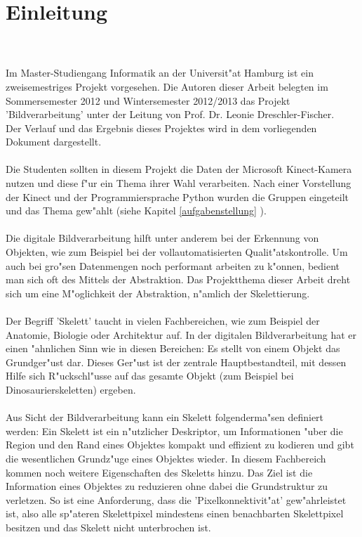 \chapter{Einleitung}
\label{ch:einleitung}
\\ \\
Im Master-Studiengang Informatik an der Universit"at Hamburg ist ein zweisemestriges Projekt vorgesehen. Die Autoren dieser Arbeit belegten im Sommersemester 2012 und Wintersemester 2012/2013 das Projekt 'Bildverarbeitung' unter der Leitung von Prof. Dr. Leonie Dreschler-Fischer. \\
Der Verlauf und das Ergebnis dieses Projektes wird in dem vorliegenden Dokument dargestellt.
\\ \\
Die Studenten sollten in diesem Projekt die Daten der Microsoft Kinect-Kamera nutzen und diese f"ur ein Thema ihrer Wahl verarbeiten. Nach einer Vorstellung der Kinect und der Programmiersprache Python wurden die Gruppen eingeteilt und das Thema gew"ahlt (siehe Kapitel \ref{aufgabenstellung} ).  \\ \\
Die digitale Bildverarbeitung hilft unter anderem bei der Erkennung von Objekten, wie zum Beispiel bei der vollautomatisierten Qualit"atskontrolle. Um auch bei gro"sen Datenmengen noch performant arbeiten zu k"onnen, bedient man sich oft des Mittels der Abstraktion. Das Projektthema dieser Arbeit dreht sich um eine M"oglichkeit der Abstraktion, n"amlich der Skelettierung. \\ \\
Der Begriff 'Skelett' taucht in vielen Fachbereichen, wie zum Beispiel der Anatomie, Biologie oder Architektur auf. In der digitalen Bildverarbeitung hat er einen "ahnlichen Sinn wie in diesen Bereichen: Es stellt von einem Objekt das Grundger"ust dar. Dieses Ger"ust ist der zentrale Hauptbestandteil, mit dessen Hilfe sich R"uckschl"usse auf das gesamte Objekt (zum Beispiel bei Dinosaurierskeletten) ergeben. \\ \\
Aus Sicht der Bildverarbeitung kann ein Skelett folgenderma"sen definiert werden: Ein Skelett ist ein n"utzlicher Deskriptor, um Informationen "uber die Region und den Rand eines Objektes kompakt und effizient zu kodieren und gibt die wesentlichen Grundz"uge eines Objektes wieder. In diesem Fachbereich kommen noch weitere Eigenschaften des Skeletts hinzu. Das Ziel ist die Information eines Objektes zu reduzieren ohne dabei die Grundstruktur zu verletzen. So ist eine Anforderung, dass die 'Pixelkonnektivit"at' gew"ahrleistet ist, also alle sp"ateren Skelettpixel mindestens einen benachbarten Skelettpixel besitzen und das Skelett nicht unterbrochen ist. \\ \\
